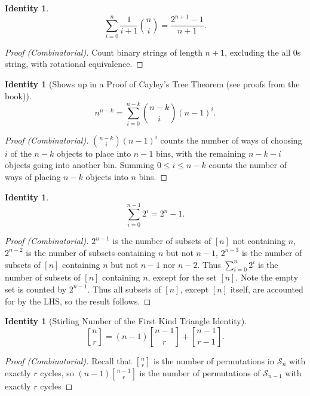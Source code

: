 \documentclass[12]{article}
\newcounter{identityCounter}
\newtheorem{iden}[identityCounter]{Identity}
\theoremstyle{definition}
\begin{document}
	\begin{iden}
		$$\sum_{i=0}^{n} \frac{1}{i+1} {n \choose i} = \frac{2^{n+1}-1}{n+1}.$$
	\end{iden}
	\begin{proof}[Proof (Combinatorial)]
		Count binary strings of length $n+1$, excluding the all $0$s string, with rotational equivalence.
	\end{proof}

	\begin{iden}[Shows up in a Proof of Cayley's Tree Theorem (see proofs from the book)]
		$$n^{n-k} = \sum_{i=0}^{n-k}{n-k \choose i}(n-1)^i.$$
	\end{iden}
	\begin{proof}[Proof (Combinatorial)]
		${n-k \choose i}(n-1)^i$ counts the number of ways of choosing $i$ of the $n-k$ objects to place into $n-1$ bins, with the remaining $n-k-i$ objects going into another bin.  Summing $0 \leq i \leq n-k$ counts the number of ways of placing $n-k$ objects into $n$ bins.
	\end{proof}

	\begin{iden}
		$$\sum_{i=0}^{n-1} 2^i = 2^n-1.$$
	\end{iden}
	\begin{proof}[Proof (Combinatorial)]
		$2^{n-1}$ is the number of subsets of $[n]$ not containing $n$, $2^{n-2}$ is the number of subsets containing $n$ but not $n-1$, $2^{n-3}$ is the number of subsets of $[n]$ containing $n$ but not $n-1$ nor $n-2$. Thus $\sum_{i = 0}^n 2^i$ is the number of subsets of $[n]$ containing $n$, except for the set $[n]$.  Note the empty set is counted by $2^{n-1}$.  Thus all subsets of $[n]$, except $[n]$ itself, are accounted for by the LHS, so the result follows.
	\end{proof}

	\begin{iden}[Stirling Number of the First Kind Triangle Identity]
		$${n \brack r} = (n-1){n-1 \brack r} + {n-1 \brack r-1}.$$
	\end{iden}
	\begin{proof}[Proof (Combinatorial)]
		Recall that ${n \brack r}$ is the number of permutations in $\mathcal{S}_n$ with exactly $r$ cycles, so $(n-1){n-1 \brack r}$ is the number of permutations of $\mathcal{S}_{n-1}$ with exactly $r$ cycles
	\end{proof}
\end{document}
